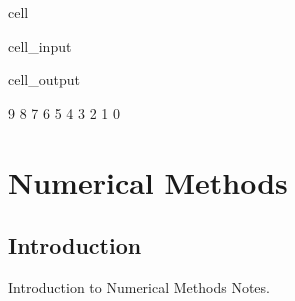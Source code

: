 \documentclass[a4paper,10pt,english]{jupyterBook}
\begin{document}
\begin{sphinxuseclass}{cell}\begin{sphinxVerbatimInput}

\begin{sphinxuseclass}{cell_input}
\begin{sphinxVerbatim}[commandchars=\\\{\}]
\end{sphinxVerbatim}

\end{sphinxuseclass}\end{sphinxVerbatimInput}
\begin{sphinxVerbatimOutput}

\begin{sphinxuseclass}{cell_output}
\begin{sphinxVerbatim}[commandchars=\\\{\}]
9 8 7 6 5 4 3 2 1 0 
\end{sphinxVerbatim}

\end{sphinxuseclass}\end{sphinxVerbatimOutput}

\end{sphinxuseclass}
\sphinxstepscope


\part{Numerical Methods}

\sphinxstepscope


\chapter{Introduction}
\label{\detokenize{text/num/intro:introduction}}\label{\detokenize{text/num/intro::doc}}
\sphinxAtStartPar
Introduction to Numerical Methods Notes.







\renewcommand{\indexname}{Index}
\printindex
\end{document}
